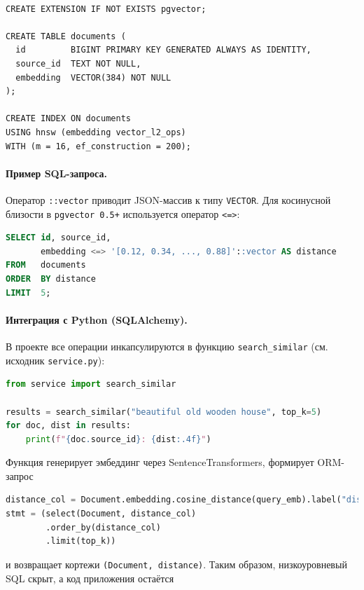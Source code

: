\begin{lstlisting}
      
CREATE EXTENSION IF NOT EXISTS pgvector;

CREATE TABLE documents (
  id         BIGINT PRIMARY KEY GENERATED ALWAYS AS IDENTITY,
  source_id  TEXT NOT NULL,
  embedding  VECTOR(384) NOT NULL
);

CREATE INDEX ON documents
USING hnsw (embedding vector_l2_ops)
WITH (m = 16, ef_construction = 200);
\end{lstlisting}


\paragraph{Пример SQL-запроса.}
Оператор \verb|::vector| приводит JSON-массив к типу \texttt{VECTOR}\@.
Для косинусной близости в \texttt{pgvector 0.5+}
используется оператор \verb|<=>|:

\begin{lstlisting}[language=SQL]
SELECT id, source_id,
       embedding <=> '[0.12, 0.34, ..., 0.88]'::vector AS distance
FROM   documents
ORDER  BY distance                               
LIMIT  5;
\end{lstlisting}

\paragraph{Интеграция с Python (SQLAlchemy).}
В проекте все операции инкапсулируются в функцию
\verb|search_similar| (см. исходник \verb|service.py|):

\begin{lstlisting}[language=Python]
from service import search_similar

results = search_similar("beautiful old wooden house", top_k=5)
for doc, dist in results:
    print(f"{doc.source_id}: {dist:.4f}")
\end{lstlisting}

Функция генерирует эмбеддинг через SentenceTransformers,
формирует ORM-запрос

\begin{lstlisting}[language=Python]
distance_col = Document.embedding.cosine_distance(query_emb).label("distance")
stmt = (select(Document, distance_col)
        .order_by(distance_col)
        .limit(top_k))
\end{lstlisting}

и возвращает кортежи \verb|(Document, distance)|.  
Таким образом, низкоуровневый SQL скрыт,
а код приложения остаётся 
